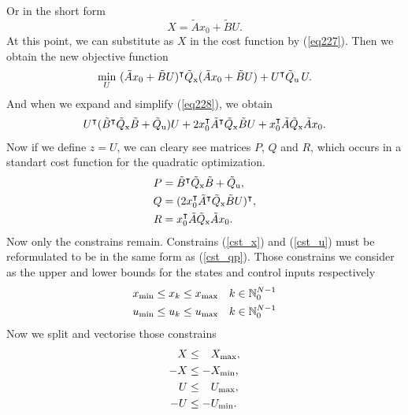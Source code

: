 Or in the short form
\begin{equation}\label{eq227}
	X = \tilde{A}x_0 + \tilde{B}U.
\end{equation}
At this point, we can substitute as $X$ in the cost function by (\ref{eq227}). Then we obtain the new objective function
\begin{equation}\label{eq228}
	\min_{U}\ (\tilde{A}x_0 + \tilde{B}U)^\intercal\tilde{Q} _{\text{x}}(\tilde{A}x_0 + \tilde{B}U) + U^\intercal\tilde{Q} _{\text{u}}\,U.
\end{equation}
And when we expand and simplify (\ref{eq228}), we obtain
\begin{equation}
	U^\intercal(\tilde{B}^\intercal\tilde{Q} _{\text{x}}\tilde{B} + \tilde{Q} _{\text{u}})U + 2x_0^\intercal\tilde{A}^\intercal\tilde{Q} _{\text{x}}\tilde{B}U + x_0^\intercal\tilde{A}\tilde{Q} _{\text{x}}\tilde{A}x_0.
\end{equation}
Now if we define $z = U$, we can cleary see matrices $P$, $Q$ and $R$, which occurs in a standart cost function for the quadratic optimization.
\begin{subequations}
	\begin{align}
		P &= \tilde{B}^\intercal\tilde{Q} _{\text{x}}\tilde{B} + \tilde{Q} _{\text{u}},\\
		Q &= (2x_0^\intercal\tilde{A}^\intercal\tilde{Q} _{\text{x}}\tilde{B}U)^\intercal,\\
		R &= x_0^\intercal\tilde{A}\tilde{Q} _{\text{x}}\tilde{A}x_0.
	\end{align}
\end{subequations}
Now only the constrains remain. Constrains (\ref{cst_x}) and (\ref{cst_u}) must be reformulated to be in the same form as (\ref{cst_qp}). Those constrains we consider as the upper and lower bounds for the states and control inputs respectively
\begin{subequations}
	\begin{align}
		x _{\text{min}} &\leq x_k \leq x _{\text{max}} \quad k \in \mathbb{N}_0^{N-1}\\
		u _{\text{min}} &\leq u_k \leq u _{\text{max}} \quad k \in \mathbb{N}_0^{N-1}
	\end{align}
\end{subequations}
Now we split and vectorise those constrains
\begin{subequations}
\begin{align}
	X &\leq \ \; \, X _{\text{max}},\\
	-X &\leq -X _{\text{min}},\\
	U &\leq \ \; \, U _{\text{max}},\\
	-U &\leq -U _{\text{min}}.
\end{align}
\end{subequations}
